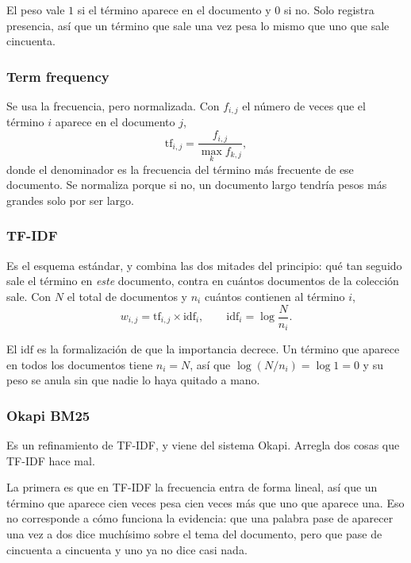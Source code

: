 \documentclass[11pt,letterpaper]{article}
\begin{document}
El peso vale $1$ si el término aparece en el documento y $0$ si no.
Solo registra presencia, así que un término que sale una vez pesa lo
mismo que uno que sale cincuenta.

\subsubsection*{Term frequency}

Se usa la frecuencia, pero normalizada. Con $f_{i,j}$ el número de
veces que el término $i$ aparece en el documento $j$,
\[
    \mathrm{tf}_{i,j} = \frac{f_{i,j}}{\max_k f_{k,j}} ,
\]
donde el denominador es la frecuencia del término más frecuente de
ese documento. Se normaliza porque si no, un documento largo tendría
pesos más grandes solo por ser largo.

\subsubsection*{TF-IDF}

Es el esquema estándar, y combina las dos mitades del principio: qué
tan seguido sale el término en \emph{este} documento, contra en
cuántos documentos de la colección sale. Con $N$ el total de
documentos y $n_i$ cuántos contienen al término $i$,
\[
    w_{i,j} = \mathrm{tf}_{i,j} \times \mathrm{idf}_i ,
    \qquad
    \mathrm{idf}_i = \log \frac{N}{n_i} .
\]

\begin{idea}
    El $\mathrm{idf}$ es la formalización de que la importancia
    decrece. Un término que aparece en todos los documentos tiene
    $n_i = N$, así que $\log(N/n_i) = \log 1 = 0$ y su peso se anula
    sin que nadie lo haya quitado a mano.
\end{idea}

\subsubsection*{Okapi BM25}

Es un refinamiento de TF-IDF, y viene del sistema Okapi. Arregla dos
cosas que TF-IDF hace mal.

La primera es que en TF-IDF la frecuencia entra de forma lineal, así
que un término que aparece cien veces pesa cien veces más que uno que
aparece una. Eso no corresponde a cómo funciona la evidencia: que una
palabra pase de aparecer una vez a dos dice muchísimo sobre el tema
del documento, pero que pase de cincuenta a cincuenta y uno ya no
dice casi nada.
\end{document}

